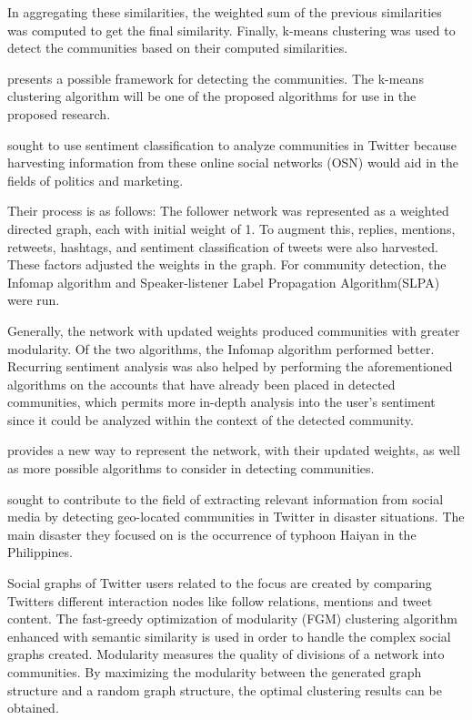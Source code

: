 In aggregating these similarities, the weighted sum of the previous similarities was computed to get the final similarity. Finally, k-means clustering was used to detect the communities based on their computed similarities. 

 presents a possible framework for detecting the communities. The k-means clustering algorithm will be one of the proposed algorithms for use in the proposed research.

 sought to use sentiment classification to analyze communities in Twitter because harvesting information from these online social networks (OSN) would aid in the fields of politics and marketing. 

Their process is as follows: The follower network was represented as a weighted directed graph, each with initial weight of 1. To augment this, replies, mentions, retweets, hashtags, and sentiment classification of tweets were also harvested. These factors adjusted the weights in the graph. For community detection, the Infomap algorithm and Speaker-listener Label Propagation Algorithm(SLPA) were run. 

Generally, the network with updated weights produced communities with greater modularity. Of the two algorithms, the Infomap algorithm performed better. Recurring sentiment analysis was also helped by performing the aforementioned algorithms on the accounts that have already been placed in detected communities, which permits more in-depth analysis into the user’s sentiment since it could be analyzed within the context of the detected community.

 provides a new way to represent the network, with their updated weights, as well as more possible algorithms to consider in detecting communities.

 sought to contribute to the field of extracting relevant information from social media by detecting geo-located communities in Twitter in disaster situations. The main disaster they focused on is the occurrence of typhoon Haiyan in the Philippines. 

Social graphs of Twitter users related to the focus are created by comparing Twitter\vtick s different interaction nodes like follow relations, mentions and tweet content. The fast-greedy optimization of modularity (FGM) clustering algorithm enhanced with semantic similarity is used in order to handle the complex social graphs created. Modularity measures the quality of divisions of a network into communities. By maximizing the modularity between the generated graph structure and a random graph structure, the optimal clustering results can be obtained. 

